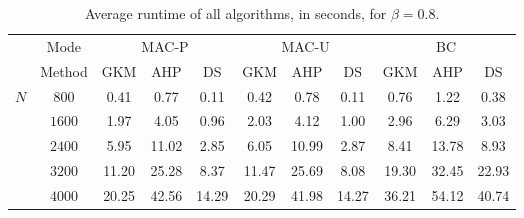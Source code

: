 \begin{table}[htb]
\centering    
\caption{Average runtime of all algorithms, in seconds, for $\beta=0.8$.}
\label{usch:tab:runtime}
\begin{tabular}{cc||ccc|ccc||ccc}
	& Mode & \multicolumn{3}{c|}{MAC-P} & \multicolumn{3}{c||}{MAC-U} & \multicolumn{3}{c}{BC}\\
	& Method & GKM & AHP & DS & GKM & AHP & DS  & GKM & AHP & DS \\\hline
	\multirow{5}{*}{$N$}
	& $800$  & 0.41 & 0.77 & 0.11 & 0.42& 0.78& 0.11 & 0.76& 1.22& 0.38\\
	& $1600$ & 1.97& 4.05& 0.96&2.03&4.12& 1.00& 2.96& 6.29& 3.03\\
	& $2400$ & 5.95&11.02&2.85&6.05&10.99&2.87&8.41&13.78&8.93\\
	& $3200$ &11.20&25.28&8.37&11.47&25.69&8.08&19.30&32.45&22.93 \\
	& $4000$ & 20.25&42.56&14.29&20.29&41.98&14.27&36.21&54.12&40.74\\
\end{tabular}
\end{table}


